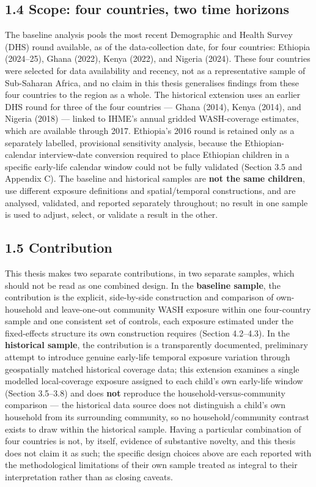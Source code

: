 \subsection*{1.4 Scope: four countries, two time horizons}

The baseline analysis pools the most recent Demographic and Health Survey (DHS) round available, as of the data-collection date, for four countries: Ethiopia (2024--25), Ghana (2022), Kenya (2022), and Nigeria (2024). These four countries were selected for data availability and recency, not as a representative sample of Sub-Saharan Africa, and no claim in this thesis generalises findings from these four countries to the region as a whole. The historical extension uses an earlier DHS round for three of the four countries --- Ghana (2014), Kenya (2014), and Nigeria (2018) --- linked to IHME's annual gridded WASH-coverage estimates, which are available through 2017. Ethiopia's 2016 round is retained only as a separately labelled, provisional sensitivity analysis, because the Ethiopian-calendar interview-date conversion required to place Ethiopian children in a specific early-life calendar window could not be fully validated (Section 3.5 and Appendix C). The baseline and historical samples are \textbf{not the same children}, use different exposure definitions and spatial/temporal constructions, and are analysed, validated, and reported separately throughout; no result in one sample is used to adjust, select, or validate a result in the other.

\subsection*{1.5 Contribution}

This thesis makes two separate contributions, in two separate samples, which should not be read as one combined design. In the \textbf{baseline sample}, the contribution is the explicit, side-by-side construction and comparison of own-household and leave-one-out community WASH exposure within one four-country sample and one consistent set of controls, each exposure estimated under the fixed-effects structure its own construction requires (Section 4.2--4.3). In the \textbf{historical sample}, the contribution is a transparently documented, preliminary attempt to introduce genuine early-life temporal exposure variation through geospatially matched historical coverage data; this extension examines a single modelled local-coverage exposure assigned to each child's own early-life window (Section 3.5--3.8) and does \textbf{not} reproduce the household-versus-community comparison --- the historical data source does not distinguish a child's own household from its surrounding community, so no household/community contrast exists to draw within the historical sample. Having a particular combination of four countries is not, by itself, evidence of substantive novelty, and this thesis does not claim it as such; the specific design choices above are each reported with the methodological limitations of their own sample treated as integral to their interpretation rather than as closing caveats.

